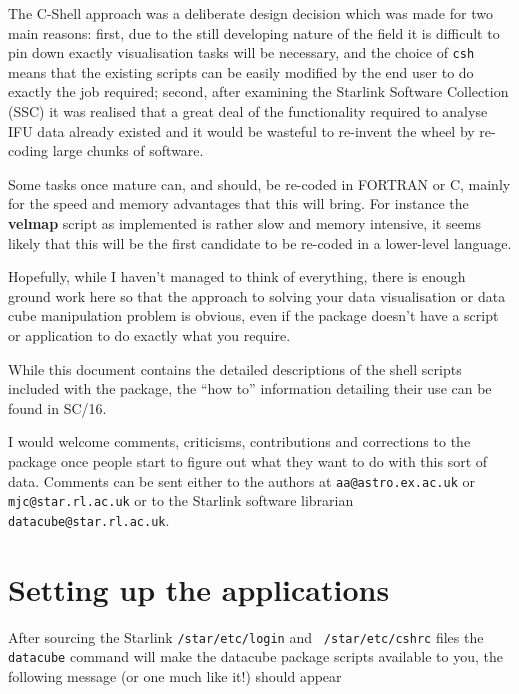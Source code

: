 \documentclass[twoside,11pt]{article}
\newcommand{\htmladdnormallink}[2]{#1}
\newcommand{\htmlref}[2]{#1}
\newcommand{\xref}[3]{#1}
\newcommand{\xlabel}[1]{}
\renewcommand{\_}{\texttt{\symbol{95}}}
\begin{document}
The C-Shell approach was a deliberate design decision which was made
for two main reasons: first, due to the still developing nature of
the field it is difficult to pin down exactly visualisation tasks will
be necessary, and the choice of {\tt csh} means that the existing
scripts can be easily modified by the end user to do exactly the job
required; second, after examining the Starlink Software Collection
(SSC) it was realised that a great deal of the functionality required
to analyse IFU data already existed and it would be wasteful to
re-invent the wheel by re-coding large chunks of software.

Some tasks once mature can, and should, be re-coded in FORTRAN or C,
mainly for the speed and memory advantages that this will bring. For
instance the \htmlref{{\bf velmap}}{velmap} script as implemented is
rather slow and memory intensive, it seems likely that this will be
the first candidate to be re-coded in a lower-level language.

Hopefully, while I haven't managed to think of everything, there is
enough ground work here so that the approach to solving your data
visualisation or data cube manipulation problem is obvious, even if
the package doesn't have a script or application to do exactly what
you require.

While this document contains the detailed descriptions of the shell
scripts included with the package, the ``how to'' information
detailing their use can be found in \xref{SC/16}{sc16}{}.

I would welcome comments, criticisms, contributions and corrections to
the package once people start to figure out what they want to do with
this sort of data.  Comments can be sent either to the authors at
\htmladdnormallink{{\tt aa@astro.ex.ac.uk}}{mailto:aa@astro.ex.ac.uk} or
\htmladdnormallink{{\tt mjc@star.rl.ac.uk}}{mailto:mjc@star.rl.ac.uk} or
to the Starlink software librarian
\htmladdnormallink{{\tt datacube@star.rl.ac.uk}}{mailto:datacube@star.rl.ac.uk}.

\section{\xlabel{sun237_starting}Setting up the applications\label{sun237_starting}}

After sourcing the Starlink {\tt /star/etc/login} and {\tt
/star/etc/cshrc} files the {\tt datacube} command will make the
datacube package scripts available to you, the following
message (or one much like it!) should appear
\end{document}
